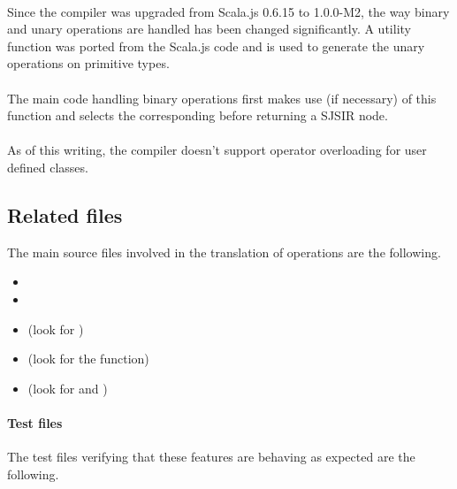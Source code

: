 \paragraph{} Since the compiler was upgraded from Scala.js 0.6.15 to 1.0.0-M2, the way binary and 
unary operations are handled has been changed significantly. A utility function 
 was ported from the Scala.js code and is used to generate the 
 unary operations on primitive types.

\paragraph{} The main code handling binary operations first makes use (if necessary) of this 
 function and selects the corresponding  
before returning a  SJSIR node.

\paragraph{} As of this writing, the compiler doesn't support operator overloading for user defined 
classes.

\subsection{Related files} The main source files involved in the translation of operations are 
the following.

\begin{itemize}
 \item {}
 \item {}
 \item {} (look for )
 \item {} (look for the  function)
 \item {} (look for  and 
)
\end{itemize}

\paragraph{Test files} The test files verifying that these features are behaving as 
expected are the following.

